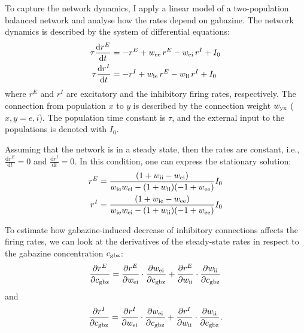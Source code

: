     To capture the network dynamics, I apply a linear model of a two-population
    balanced network and analyse how the rates depend on gabazine. The network
    dynamics is described by the system of differential equations:
    \begin{equation}
      \begin{split}
        \tau \frac{\text{d}r^E}{\text{d}t} &= - r^E + w_{\rm ee} \, r^E -w_{\rm ei} \, r^I + I_0\\
        \tau \frac{\text{d}r^I}{\text{d}t} &= - r^I + w_{\rm ie} \, r^E -w_{\rm ii} \, r^I + I_0\\
      \end{split}
      \label{eq:balanced_net}
    \end{equation}
    where $r^E$ and $r^I$ are excitatory and the inhibitory firing rates,
    respectively. The connection from population $x$ to $y$ is described by the
    connection weight $w_{\rm yx}$ ($x,y = e, i$). The population time constant
    is $\tau$, and the external input to the populations is denoted with $I_0$.

    Assuming that the network is in a steady state, then the rates are
    constant, i.e., $ \frac{\text{d}r^E}{\text{d}t} = 0$ and
    $\frac{\text{d}r^I}{\text{d}t} = 0 $. In this condition, one can express
    the stationary solution:
    \begin{equation}
      \begin{split}
        r^E &= \frac{(1+w_{\rm ii} - w_{\rm ei})}{w_{\rm ie}w_{\rm ei} -
                (1+w_{\rm ii})(-1+w_{\rm ee})} I_0 \\
        r^I &= \frac{(1+w_{\rm ie} - w_{\rm ee})}{w_{\rm ie}w_{\rm ei} -
                (1+w_{\rm ii})(-1+w_{\rm ee})} I_0
      \end{split}
      \label{eq:balanced_sol}
    \end{equation}
  
    To estimate how gabazine-induced decrease of inhibitory connections
    affects the firing rates, we can look at the derivatives of the
    steady-state rates in respect to the gabazine concentration $c_{\rm gbz}$:
    \begin{equation}
      \frac{\partial r^E}{\partial c_{\rm gbz}} =
      \frac{\partial r^E}{\partial w_{\rm ei}} \cdot \frac{\partial w_{\rm ei}}{\partial c_{\rm gbz}} + 
      \frac{\partial r^E}{\partial w_{\rm ii}} \cdot \frac{\partial w_{\rm ii}}{\partial c_{\rm gbz}}
      \label{eq:re_chain}
    \end{equation}
    and
    \begin{equation}
      \frac{\partial r^I}{\partial c_{\rm gbz}} =
      \frac{\partial r^I}{\partial w_{\rm ei}} \cdot \frac{\partial w_{\rm ei}}{\partial c_{\rm gbz}} + 
      \frac{\partial r^I}{\partial w_{\rm ii}} \cdot \frac{\partial w_{\rm ii}}{\partial c_{\rm gbz}}.
      \label{eq:ri_chain}
    \end{equation}

